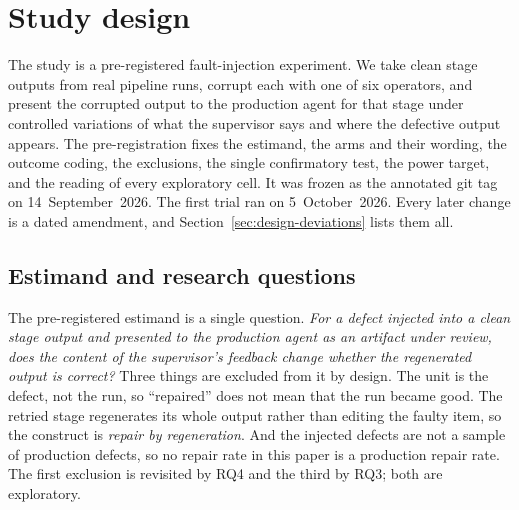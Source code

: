 \section{Study design}
\label{sec:design}

The study is a pre-registered fault-injection experiment. We take clean stage
outputs from real pipeline runs, corrupt each with one of six operators, and
present the corrupted output to the production agent for that stage under
controlled variations of what the supervisor says and where the defective
output appears. The pre-registration fixes the estimand, the arms and their
wording, the outcome coding, the exclusions, the single confirmatory test, the
power target, and the reading of every exploratory cell. It was frozen as the
annotated git tag  on 14~September~2026. The first trial
ran on 5~October~2026. Every later change is a dated amendment, and
Section~\ref{sec:design-deviations} lists them all.

\subsection{Estimand and research questions}
\label{sec:design-rq}

The pre-registered estimand is a single question. \emph{For a defect injected
into a clean stage output and presented to the production agent as an artifact
under review, does the content of the supervisor's feedback change whether the
regenerated output is correct?} Three things are excluded from it by design.
The unit is the defect, not the run, so ``repaired'' does not mean that the run
became good. The retried stage regenerates its whole output rather than editing
the faulty item, so the construct is \emph{repair by regeneration}. And the
injected defects are not a sample of production defects, so no repair rate in
this paper is a production repair rate. The first exclusion is revisited by
RQ4 and the third by RQ3; both are exploratory.

